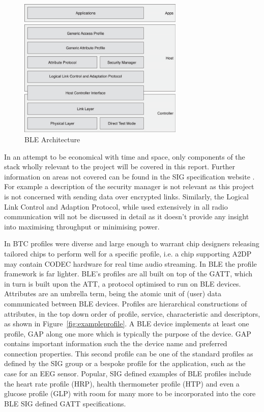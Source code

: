 \documentclass[]{article}
\begin{document}
\begin{figure}[htb]
	\begin{center}
		\includegraphics[width = 0.7\textwidth]{ble_arch}
	\end{center}
	\caption{\ac{BLE} Architecture}
	\label{fig:ble_arch}
\end{figure}

In an attempt to be economical with time and space, only components of the stack wholly relevant to the project will be covered in this report. Further information on areas not covered can be found in the \ac{SIG} specification website \cite{btspec}. For example a description of the security manager is not relevant as this project is not concerned with sending data over encrypted links. Similarly, the Logical Link Control and Adaption Protocol, while used extensively in all radio communication will not be discussed in detail as it doesn't provide any insight into maximising throughput or minimising power.

In \ac{BTC} profiles were diverse and large enough to warrant chip designers releasing tailored chips to perform well for a specific profile, i.e. a chip supporting A2DP may contain \ac{CODEC} hardware for real time audio streaming. In \ac{BLE} the profile framework is far lighter. \ac{BLE}'s profiles are all built on top of  the \ac{GATT}, which in turn is built upon the \ac{ATT}, a protocol optimised to run on BLE devices. Attributes are an umbrella term, being the atomic unit of (user) data communicated between BLE devices. Profiles are hierarchical constructions of attributes, in the top down order of profile, service, characteristic and descriptors, as shown in Figure~\ref{fig:exampleprofile}. A BLE device implements at least one profile, \ac{GAP} along one more which is typically the purpose of the device. \ac{GAP} contains important information such the the device name and preferred connection properties.  This second profile can be one of the standard profiles as defined by the SIG group or a bespoke profile for the application, such as the case for an \ac{EEG} sensor. Popular, SIG defined examples of \ac{BLE} profiles include the heart rate profile (HRP), health thermometer profile (HTP) and even a glucose profile (GLP) with room for many more to be incorporated into the core \ac{BLE} \ac{SIG} defined \ac{GATT} specifications.  
\end{document}
